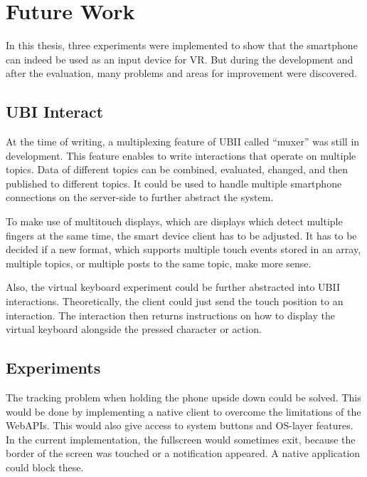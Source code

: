 \chapter{Future Work}\label{chapter:future-work}

In this thesis, three experiments were implemented to show that the smartphone can indeed be used as an input device for \ac{VR}. But during the development and after the evaluation, many problems and areas for improvement were discovered. 



\section{UBI Interact}\label{section:fw-ubii}

At the time of writing, a multiplexing feature of \ac{UBII} called \enquote{muxer} was still in development. This feature enables to write interactions that operate on multiple topics. Data of different topics can be combined, evaluated, changed, and then published to different topics. It could be used to handle multiple smartphone connections on the server-side to further abstract the system.

To make use of multitouch displays, which are displays which detect multiple fingers at the same time, the smart device client has to be adjusted. It has to be decided if a new format, which supports multiple touch events stored in an array, multiple topics, or multiple posts to the same topic, make more sense.

Also, the virtual keyboard experiment could be further abstracted into \ac{UBII} interactions. Theoretically, the client could just send the touch position to an interaction. The interaction then returns instructions on how to display the virtual keyboard alongside the pressed character or action.



\section{Experiments}\label{section:fw-experiments}

The tracking problem when holding the phone upside down could be solved. This would be done by implementing a native client to overcome the limitations of the WebAPIs. This would also give access to system buttons and \ac{OS}-layer features. In the current implementation, the fullscreen would sometimes exit, because the border of the screen was touched or a notification appeared. A native application could block these.

